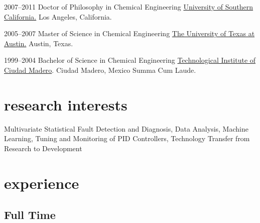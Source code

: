 \documentclass[]{../friggeri-cv} %
\begin{document}
\begin{entrylist}


\entry
{2007--2011}
{Doctor of Philosophy {\normalfont in Chemical Engineering}}
{\flushright \href{http://chems.usc.edu}{University of Southern California.} Los Angeles, California.}


\entry
{2005--2007}
{Master of Science {\normalfont in Chemical Engineering}}
{\flushright \href{http://www.che.utexas.edu/}{The University of Texas at Austin.}
Austin, Texas.}


\entry
{1999--2004}
{Bachelor of Science {\normalfont in Chemical Engineering}}
{\flushright \href{http://www.itcm.edu.mx/}{Technological Institute of Ciudad Madero}.
Ciudad Madero, Mexico}
{Summa Cum Laude.}


\end{entrylist}


\section{research interests}
Multivariate Statistical Fault Detection and Diagnosis, Data Analysis, Machine Learning, Tuning and Monitoring of PID Controllers, Technology Transfer from Research to Development

\section{experience}

\subsection{Full Time}
\end{document}
